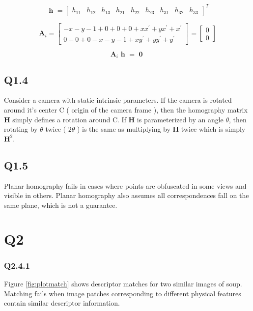 \documentclass[12pt]{article}
\begin{document}
$$
\textbf { h } = 
\begin{bmatrix}
h_{11} & h_{12} & h_{13} & h_{21} & h_{22} & h_{23} & h_{31} & h_{32} & h_{33} 
\end{bmatrix}^{T}
$$

$$
\textbf{A}_{i} = 
\begin{bmatrix}
- x 
- y 
- 1
+ 0 + 0 + 0
+ x  x^{ \prime }
+ y  x^{ \prime }
+ x^{ \prime }   \\
0 + 0 + 0
- x 
- y 
- 1
+ x y^{ \prime } 
+ y y^{ \prime } 
+   y^{ \prime } 
\end{bmatrix}
=
\begin{bmatrix}
0 \\ 0
\end{bmatrix}
$$

$$
\textbf{A}_{i} 
\textbf { h } =  \textbf { 0 }
$$


\newpage
\subsection{Q1.4}
Consider a camera with static intrinsic parameters. If the camera is rotated around it's center C ( origin of the camera frame ), then the homography matrix $\textbf{H}$ simply defines a rotation around C. If  $\textbf{H}$ is parameterized by an angle $\theta$, then rotating by $\theta$ twice ( $2 \theta$ ) is the same as multiplying by $\textbf{H}$ twice which is simply $\textbf{H}^{2}$.


\newpage
\subsection{Q1.5}
Planar homography fails in cases where points are obfuscated in some views and visible in others. Planar homography also assumes all correspondences fall on the same plane, which is not a guarantee.

\newpage
\section { Q2 }

\subsubsection { Q2.4.1 }

Figure \ref{fig:plotmatch} shows descriptor matches for two similar images of soup. Matching fails when image patches corresponding to different physical features contain similar descriptor information.
\end{document}

